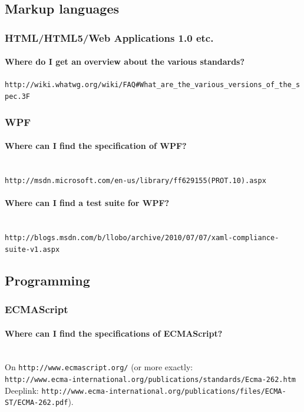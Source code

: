\documentclass[10pt]{scrbook}
\begin{document}
\subsection{Markup languages}

\subsubsection{HTML/HTML5/Web Applications 1.0 etc.}

\paragraph{Where do I get an overview about the various standards?}

\verb|http://wiki.whatwg.org/wiki/FAQ#What_are_the_various_versions_of_the_spec.3F|

\subsubsection{WPF}

\paragraph{Where can I find the specification of WPF?} ~ \\
\verb|http://msdn.microsoft.com/en-us/library/ff629155(PROT.10).aspx|

\paragraph{Where can I find a test suite for WPF?} ~ \\
\verb|http://blogs.msdn.com/b/llobo/archive/2010/07/07/xaml-compliance-suite-v1.aspx|

\subsection{Programming}

\subsubsection{ECMAScript}

\paragraph{Where can I find the specifications of ECMAScript?} ~ \\
On \verb|http://www.ecmascript.org/| (or more exactly: \\
\verb|http://www.ecma-international.org/publications/standards/Ecma-262.htm| \\
Deeplink: \verb|http://www.ecma-international.org/publications/files/ECMA-ST/ECMA-262.pdf|).
\end{document}
